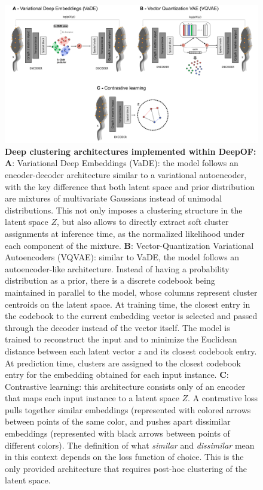 \begin{figure}[!thb]
\centering
\includegraphics[width=\textwidth]{Figures/methods_2.pdf}

\caption[\textbf{Deep clustering architectures implemented within DeepOF}]{\textbf{Deep clustering architectures implemented within DeepOF:} \textbf{A}: Variational Deep Embeddings (VaDE): the model follows an encoder-decoder architecture similar to a variational autoencoder, with the key difference that both latent space and prior distribution are mixtures of multivariate Gaussians instead of unimodal distributions. This not only imposes a clustering structure in the latent space $Z$, but also allows to directly extract soft cluster assignments at inference time, as the normalized likelihood under each component of the mixture. \textbf{B}: Vector-Quantization Variational Autoencoders (VQVAE): similar to VaDE, the model follows an autoencoder-like architecture. Instead of having a probability distribution as a prior, there is a discrete codebook being maintained in parallel to the model, whose columns represent cluster centroids on the latent space. At training time, the closest entry in the codebook to the current embedding vector is selected and passed through the decoder instead of the vector itself. The model is trained to reconstruct the input and to minimize the Euclidean distance between each latent vector $z$ and its closest codebook entry. At prediction time, clusters are assigned to the closest codebook entry for the embedding obtained for each input instance. \textbf{C}: Contrastive learning: this architecture consists only of an encoder that maps each input instance to a latent space $Z$. A contrastive loss pulls together similar embeddings (represented with colored arrows between points of the same color, and pushes apart dissimilar embeddings (represented with black arrows between points of different colors). The definition of what \textit{similar} and \textit{dissimilar} mean in this context depends on the loss function of choice. This is the only provided architecture that requires post-hoc clustering of the latent space.}
\label{fig:3.2}

\end{figure}

